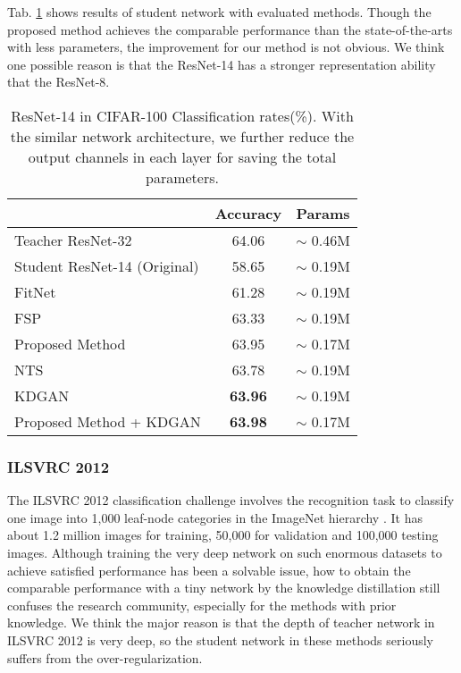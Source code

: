 \documentclass[10pt,twocolumn,letterpaper]{article}
\begin{document}
Tab. \ref{tab:cifar100} shows results of student network with evaluated methods.
Though the proposed method achieves the comparable performance
than the state-of-the-arts \cite{huang2017like, wang2018kdgan} with less parameters,
the improvement for our method is not obvious.
We think one possible reason is that
the ResNet-14 has a stronger representation ability that the ResNet-8.


\begin{table}[t]
\begin{center}
\begin{tabular}{l|c|c}
\hline
 & Accuracy & Params\\
\hline
Teacher ResNet-32 & 64.06 & $\sim$ 0.46M\\
Student ResNet-14 (Original) & 58.65 & $\sim$ 0.19M\\
FitNet \cite{Romero2014FitNets} & 61.28 & $\sim$ 0.19M\\
FSP \cite{yim2017gift} & 63.33 & $\sim$ 0.19M\\
Proposed Method & 63.95 & $\sim$ 0.17M\\
NTS \cite{huang2017like} & 63.78 & $\sim$ 0.19M\\
KDGAN \cite{wang2018kdgan} & \textbf{63.96} & $\sim$ 0.19M\\
Proposed Method + KDGAN \cite{wang2018kdgan}  & \textbf{63.98} & $\sim$ 0.17M\\
\hline
\end{tabular}
\end{center}
\caption{ResNet-14 in CIFAR-100 Classification rates(\%). With the similar network architecture, we further reduce the output channels in each layer for saving the total parameters.}
\label{tab:cifar100}
\end{table}



\subsubsection{ILSVRC 2012}
The ILSVRC 2012 classification challenge
involves the recognition task to classify one image into 1,000 leaf-node categories
in the ImageNet hierarchy \cite{Krizhevsky2012}.
It has about 1.2 million images for training,
50,000 for validation and 100,000 testing images.
Although training the very deep network on such enormous datasets
to achieve satisfied performance has been a solvable issue,
how to obtain the comparable performance with
a tiny network by the knowledge distillation
still confuses the research community,
especially for the methods \cite{luo2016face, Romero2014FitNets, yim2017gift} with prior knowledge.
We think the major reason is that
the depth of teacher network in ILSVRC 2012 is very deep,
so the student network in these methods seriously suffers from the over-regularization.
\end{document}
